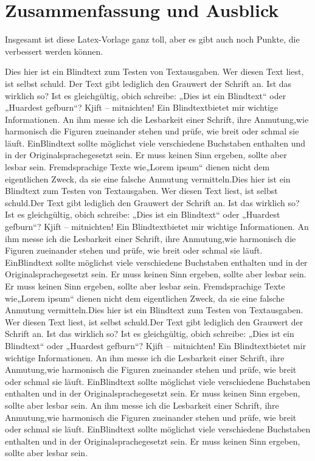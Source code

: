 
\chapter{Zusammenfassung und Ausblick}
\label{sec:Zusammenfassung}

Insgesamt ist diese Latex-Vorlage ganz toll, aber es gibt auch noch Punkte, die verbessert werden können.

Dies hier ist ein Blindtext zum Testen von Textausgaben. Wer diesen Text liest, ist selbst schuld.
Der Text gibt lediglich den Grauwert der Schrift an. Ist das wirklich so? Ist es gleichgültig, obich schreibe:
„Dies ist ein Blindtext“ oder „Huardest gefburn“? Kjift – mitnichten! Ein Blindtextbietet mir wichtige Informationen. 
An ihm messe ich die Lesbarkeit einer Schrift, ihre Anmutung,wie harmonisch die Figuren zueinander stehen und prüfe, 
wie breit oder schmal sie läuft. EinBlindtext sollte möglichst viele verschiedene Buchstaben enthalten und in der 
Originalsprachegesetzt sein. Er muss keinen Sinn ergeben, sollte aber lesbar sein. Fremdsprachige Texte wie„Lorem ipsum“ 
dienen nicht dem eigentlichen Zweck, da sie eine falsche Anmutung vermitteln.Dies hier ist ein Blindtext zum Testen von 
Textausgaben. Wer diesen Text liest, ist selbst schuld.Der Text gibt lediglich den Grauwert der Schrift an. Ist das 
wirklich so? Ist es gleichgültig, obich schreibe: „Dies ist ein Blindtext“ oder „Huardest gefburn“? Kjift – mitnichten! 
Ein Blindtextbietet mir wichtige Informationen. An ihm messe ich die Lesbarkeit einer Schrift, ihre Anmutung,wie 
harmonisch die Figuren zueinander stehen und prüfe, wie breit oder schmal sie läuft. EinBlindtext sollte möglichst viele 
verschiedene Buchstaben enthalten und in der Originalsprachegesetzt sein. Er muss keinen Sinn ergeben, sollte aber lesbar 
sein. Er muss keinen Sinn ergeben, sollte aber lesbar sein. Fremdsprachige Texte wie„Lorem ipsum“ 
dienen nicht dem eigentlichen Zweck, da sie eine falsche Anmutung vermitteln.Dies hier ist ein Blindtext zum Testen von 
Textausgaben. Wer diesen Text liest, ist selbst schuld.Der Text gibt lediglich den Grauwert der Schrift an. Ist das 
wirklich so? Ist es gleichgültig, obich schreibe: „Dies ist ein Blindtext“ oder „Huardest gefburn“? Kjift – mitnichten! 
Ein Blindtextbietet mir wichtige Informationen. An ihm messe ich die Lesbarkeit einer Schrift, ihre Anmutung,wie 
harmonisch die Figuren zueinander stehen und prüfe, wie breit oder schmal sie läuft. EinBlindtext sollte möglichst viele 
verschiedene Buchstaben enthalten und in der Originalsprachegesetzt sein. Er muss keinen Sinn ergeben, sollte aber lesbar 
sein. An ihm messe ich die Lesbarkeit einer Schrift, ihre Anmutung,wie 
harmonisch die Figuren zueinander stehen und prüfe, wie breit oder schmal sie läuft. EinBlindtext sollte möglichst viele 
verschiedene Buchstaben enthalten und in der Originalsprachegesetzt sein. Er muss keinen Sinn ergeben, sollte aber lesbar 
sein.